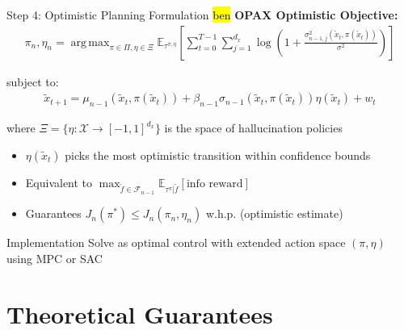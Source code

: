 \documentclass[11pt,aspectratio=169]{beamer}
\DeclareMathOperator*{\argmax}{arg\,max}
\begin{document}
\begin{frame}{Step 4: Optimistic Planning Formulation \hl{ben}}
    \textbf{OPAX Optimistic Objective:}
    \begin{align}
        \pi_n, \eta_n = \argmax_{\pi \in \Pi, \eta \in \Xi} \mathbb{E}_{\tau^{\pi,\eta}}\left[\sum_{t=0}^{T-1} \sum_{j=1}^{d_x} \log \left(1 + \frac{\sigma_{n-1, j}^2(\tilde{x}_t, \pi(\tilde{x}_t))}{\sigma^2}\right)\right]
    \end{align}
    
    subject to: 
    \begin{align}
        \tilde{x}_{t+1} = \mu_{n-1}(\tilde{x}_t, \pi(\tilde{x}_t)) + \beta_{n-1} \sigma_{n-1}(\tilde{x}_t, \pi(\tilde{x}_t)) \eta(\tilde{x}_t) + w_t
    \end{align}
    
    where $\Xi = \{\eta: \mathcal{X} \to [-1, 1]^{d_x}\}$ is the space of \alert{hallucination policies}
    
    \vspace{0.5em}
    \begin{itemize}
        \item $\eta(\tilde{x}_t)$ picks the most optimistic transition within confidence bounds
        \item Equivalent to $\max_{\tilde{f} \in \mathcal{F}_{n-1}} \mathbb{E}_{\tau^\pi | \tilde{f}}[\text{info reward}]$
        \item Guarantees $J_n(\pi^*) \leq J_n(\pi_n, \eta_n)$ w.h.p. (optimistic estimate)
    \end{itemize}
    
    \begin{alertblock}{Implementation}
        Solve as optimal control with extended action space $(\pi, \eta)$ using MPC or SAC
    \end{alertblock}
\end{frame}

\section{Theoretical Guarantees}



\end{document}
